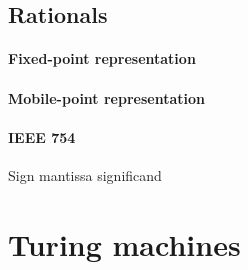 \documentclass{article}
\begin{document}
\subsection{Rationals}
\paragraph{Fixed-point representation}
\paragraph{Mobile-point representation}
\paragraph{IEEE 754}
Sign mantissa significand

\section{Turing machines}
\end{document}

